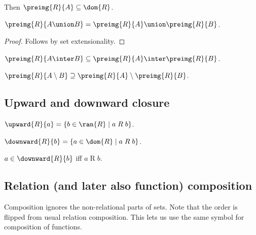 \begin{proposition}\label{preimg_subseteq_dom}
    Then $\preimg{R}{A}\subseteq \dom{R}$.
\end{proposition}

\begin{proposition}\label{preimg_union}
    $\preimg{R}{A\union B} = \preimg{R}{A}\union\preimg{R}{B}$.
\end{proposition}
\begin{proof}
    Follows by set extensionality.
\end{proof}

\begin{proposition}\label{preimg_inter}
    $\preimg{R}{A\inter B}\subseteq \preimg{R}{A}\inter\preimg{R}{B}$.
\end{proposition}

\begin{proposition}\label{preimg_setminus}
    $\preimg{R}{A\setminus B}\supseteq \preimg{R}{A}\setminus\preimg{R}{B}$.
\end{proposition}

\subsection{Upward and downward closure}

\begin{definition}\label{upward_closure}
    $\upward{R}{a} = \{b\in\ran{R} \mid a\mathrel{R}b \}$.
\end{definition}

\begin{definition}\label{downward_closure}
    $\downward{R}{b} = \{a\in\dom{R} \mid a\mathrel{R}b \}$.
\end{definition}

\begin{proposition}\label{downward_closure_iff}
    $a\in\downward{R}{b}$ iff $a\mathrel{R}b$.
\end{proposition}

\subsection{Relation (and later also function) composition}

Composition ignores the non-relational parts of sets.
Note that the order is flipped from usual relation composition.
This lets us use the same symbol for composition of functions.

